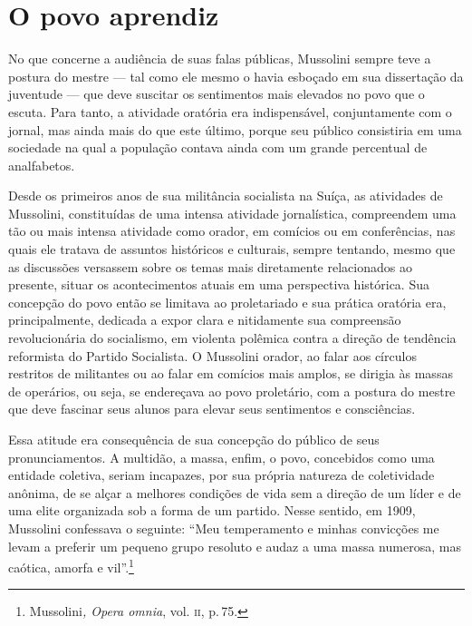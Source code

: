 \section{O povo aprendiz}

No que concerne a audiência de suas falas públicas, Mussolini sempre
teve a postura do mestre --- tal como ele mesmo o havia esboçado em sua
dissertação da juventude --- que deve suscitar os sentimentos mais
elevados no povo que o escuta. Para tanto, a atividade oratória era
indispensável, conjuntamente com o jornal, mas ainda mais do que este
último, porque seu público consistiria em uma sociedade na qual a
população contava ainda com um grande percentual de analfabetos.

Desde os primeiros anos de sua militância socialista na Suíça, as
atividades de Mussolini, constituídas de uma intensa atividade
jornalística, compreendem uma tão ou mais intensa atividade como orador,
em comícios ou em conferências, nas quais ele tratava de assuntos
históricos e culturais, sempre tentando, mesmo que as discussões
versassem sobre os temas mais diretamente relacionados ao presente,
situar os acontecimentos atuais em uma perspectiva histórica. Sua
concepção do povo então se limitava ao proletariado e sua prática
oratória era, principalmente, dedicada a expor clara e nitidamente sua
compreensão revolucionária do socialismo, em violenta polêmica contra a
direção de tendência reformista do Partido Socialista. O Mussolini
orador, ao falar aos círculos restritos de militantes ou ao falar em
comícios mais amplos, se dirigia às massas de operários, ou seja, se
endereçava ao povo proletário, com a postura do mestre que deve fascinar
seus alunos para elevar seus sentimentos e consciências.

Essa atitude era consequência de sua concepção do público de seus
pronunciamentos. A multidão, a massa, enfim, o povo, concebidos como uma
entidade coletiva, seriam incapazes, por sua própria natureza de
coletividade anônima, de se alçar a melhores condições de vida sem a
direção de um líder e de uma elite organizada sob a forma de um partido.
Nesse sentido, em 1909, Mussolini confessava o seguinte: ``Meu
temperamento e minhas convicções me levam a preferir um pequeno grupo
resoluto e audaz a uma massa numerosa, mas caótica, amorfa e
vil''.\footnote{Mussolini\emph{, Opera omnia}, vol. \textsc{ii}, p.\,75.}

